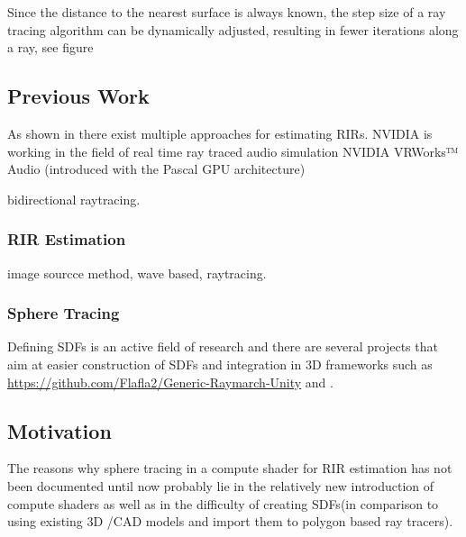 \documentclass[twoside,a4paper]{article}
\begin{document}
Since the distance to the nearest surface is always known, the step size of a ray tracing algorithm can be dynamically adjusted, resulting in fewer iterations along a ray, see figure





\subsection{Previous Work}
\label{ssec:prev}

As shown in \cite{brinkmann_round_2019} there exist multiple approaches for estimating RIRs.  
NVIDIA is working in the field of real time ray traced audio simulation
NVIDIA VRWorks™ Audio (introduced with the Pascal GPU architecture) 

\cite{cao_interactive_2016} bidirectional raytracing.

\subsubsection*{RIR Estimation}
image sourcce method, wave based, raytracing.


\subsubsection*{Sphere Tracing}

Defining SDFs is an active field of research and there are several projects that aim at easier construction of SDFs and integration in 3D frameworks such as \href{https://github.com/Flafla2/Generic-Raymarch-Unity}{https://github.com/Flafla2/Generic-Raymarch-Unity} and \cite{lechner_hrtlacektdraymarchtoolkit_2020}.



\subsection{Motivation}
The reasons why sphere tracing in a compute shader for RIR estimation has not been documented until now probably lie in the relatively new introduction of compute shaders as well as in the difficulty of creating SDFs(in comparison to using existing 3D /CAD models and import them to polygon based ray tracers).
\end{document}
